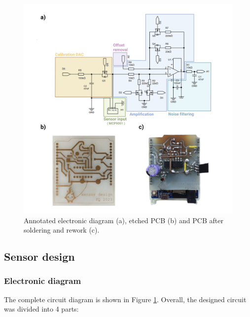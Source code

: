 \documentclass[conference]{IEEEtran}
\begin{document}
\begin{figure}[!th]
   \centering
   \includegraphics[width=\textwidth]{images/electronic_diagram.png}
   \caption{Annotated electronic diagram (a), etched PCB (b) and PCB after soldering and rework (c).}
   \label{fig:circuit}
\end{figure}

   \subsection{Sensor design}
      \subsubsection{Electronic diagram}
         The complete circuit diagram is shown in Figure \ref{fig:circuit}. Overall, the designed circuit was divided into 4 parts:
\end{document}
